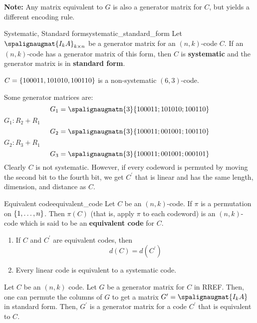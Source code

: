 \textbf{Note:} Any matrix equivalent to $ G $ is also a generator matrix
for $ C $, but yields a different encoding rule.

\begin{Definition}{Systematic, Standard form}{systematic_standard_form}
    Let $ \spalignaugmat{I_k A}_{k\times n} $ be a generator matrix
    for an $ (n,k) $-code $ C $. If an $ (n,k) $-code has a generator
    matrix of this form, then $ C $ is \textbf{systematic} and the generator
    matrix is in \textbf{standard form}.
\end{Definition}

\begin{Example}{}{}
    $ C=\{100011,101010,100110\} $
    is a non-systematic $ (6,3) $-code.

    Some generator matrices are:
    \[ G_1=\spalignaugmatn{3}{
            1 0 0 0 1 1 ;
            1 0 1 0 1 0 ;
            1 0 0 1 1 0} \]
    $ G_1: R_2+R_1 $
    \[ G_2=\spalignaugmatn{3}{
            1 0 0 0 1 1 ;
            0 0 1 0 0 1 ;
            1 0 0 1 1 0} \]
    $ G_2: R_3+R_1 $
    \[ G_3=\spalignaugmatn{3}{
            1 0 0 0 1 1 ;
            0 0 1 0 0 1 ;
            0 0 0 1 0 1} \]
    Clearly $ C $ is not systematic. However, if every codeword
    is permuted by moving the second bit to the fourth bit, we get $ C^{\prime} $
    that is linear and has the same length, dimension, and distance as $ C $.
\end{Example}

\begin{Definition}{Equivalent code}{equivalent_code}
    Let $ C $ be an $ (n,k) $-code. If $ \pi $ is a permutation on
    $ \{1,\ldots ,n\} $. Then $ \pi(C) $ (that is, apply $ \pi $ to each
    codeword) is an $ (n,k) $-code which is said to be an \textbf{equivalent code}
    for $ C $.
\end{Definition}

\begin{Theorem}{}{}
    \begin{enumerate}[label=(\arabic*)]
        \item If $ C $ and $ C^{\prime} $ are equivalent codes, then
              \[ d(C)=d(C^{\prime}) \]
        \item Every linear code is equivalent to a systematic code.
    \end{enumerate}
\end{Theorem}

\begin{Proof}{}{}
    Let $ C $ be an $ (n,k) $ code. Let $ G $ be a generator matrix for $ C $
    in RREF\@. Then, one can permute the columns of $ G $ to get a matrix
    $ G^{\prime}=\spalignaugmat{I_k A} $ in standard form. Then,
    $ G^{\prime} $ is a generator matrix for a code $ C^{\prime} $ that is
    equivalent to $ C $.
\end{Proof}

